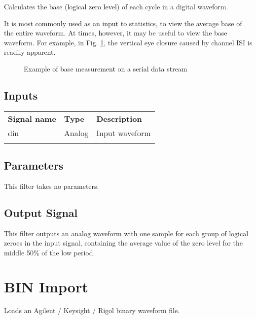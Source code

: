 Calculates the base (logical zero level) of each cycle in a digital waveform.

It is most commonly used as an input to statistics, to view the average base of the entire waveform. At times, however,
it may be useful to view the base waveform. For example, in Fig. \ref{filter_base}, the vertical eye closure caused by
channel ISI is readily apparent.

\begin{figure}[h]
\centering
{}
\caption{Example of base measurement on a serial data stream}
\label{filter_base}
\end{figure}

\subsection{Inputs}

\begin{tabularx}{16cm}{llX}
\thickhline
\textbf{Signal name} & \textbf{Type} & \textbf{Description} \\
\thickhline
din & Analog & Input waveform \\
\thickhline
\end{tabularx}

\subsection{Parameters}

This filter takes no parameters.

\subsection{Output Signal}

This filter outputs an analog waveform with one sample for each group of logical zeroes in the input signal, containing
the average value of the zero level for the middle 50\% of the low period.

\pagebreak
\section{BIN Import}

Loads an Agilent / Keysight / Rigol binary waveform file.



